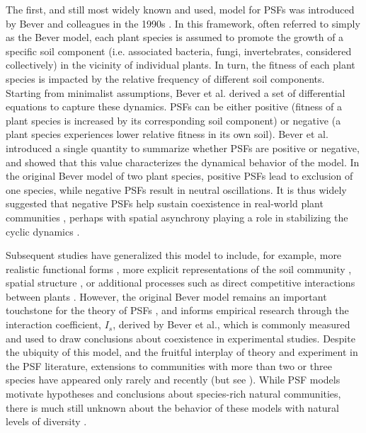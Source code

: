 \documentclass[11pt]{article}
\begin{document}
The first, and still most widely known and used, model for PSFs was introduced by Bever and colleagues in the 1990s \cite{bever1992ecological,bever1997incorporating,bever1999dynamics,bever2003soil}. In this framework, often referred to simply as the Bever model, each plant species is assumed to promote the growth of a specific soil component (i.e. associated bacteria, fungi, invertebrates, considered collectively) in the vicinity of individual plants. In turn, the fitness of each plant species is impacted by the relative frequency of different soil components. Starting from minimalist assumptions, Bever et al. \cite{bever1997incorporating} derived a set of differential equations to capture these dynamics. PSFs can be either positive (fitness of a plant species is increased by its corresponding soil component) or negative (a plant species experiences lower relative fitness in its own soil). Bever et al. introduced a single quantity to summarize whether PSFs are positive or negative, and showed that this value characterizes the dynamical behavior of the model. In the original Bever model of two plant species, positive PSFs lead to exclusion of one species, while negative PSFs result in neutral oscillations. It is thus widely suggested that negative PSFs help sustain coexistence in real-world plant communities \cite{kulmatiski2008plant,van2013plant}, perhaps with spatial asynchrony playing a role in stabilizing the cyclic dynamics \cite{revilla2013plant,bever2003soil}.

Subsequent studies have generalized this model to include, for example, more realistic functional forms \cite{umbanhowar2005simple, eppinga2006accumulation}, more explicit representations of the soil community \cite{bever2010rooting}, spatial structure \cite{eppinga2006accumulation,molofsky2002negative,suding2013consequences}, or additional processes such as direct competitive interactions between plants \cite{bever2003soil}. However, the original Bever model remains an important touchstone for the theory of PSFs \cite{ke2015incorporating,ke2020effects}, and informs empirical research through the interaction coefficient, $I_s$, derived by Bever et al., which is commonly measured and used to draw conclusions about coexistence in experimental studies. Despite the ubiquity of this model, and the fruitful interplay of theory and experiment in the PSF literature, extensions to communities with more than two or three species have appeared only rarely and recently (but see \cite{eppinga2018frequency,mack2019plant}). While PSF models motivate hypotheses and conclusions about species-rich natural communities, there is much still unknown about the behavior of these models with natural levels of diversity \cite{van2013plant}.
\end{document}

